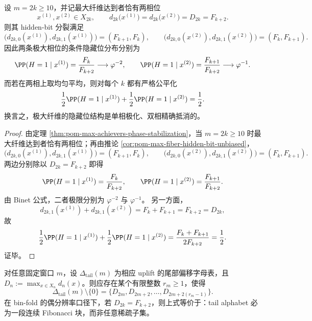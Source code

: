 \begin{theorem}[极大纤维偶支两相的精确公平化]\label{thm:conclusion-window6-even-maxfiber-hiddenbit-exact-fairization}
设 \(m=2k\ge 10\)，并记最大纤维达到者恰有两相位
\[
x^{(1)},x^{(2)}\in X_{2k},
\qquad
d_{2k}\bigl(x^{(1)}\bigr)=d_{2k}\bigl(x^{(2)}\bigr)=D_{2k}=F_{k+2}.
\]
则其 hidden-bit 分裂满足
\[
\bigl(d_{2k,0}(x^{(1)}),d_{2k,1}(x^{(1)})\bigr)=(F_{k+1},F_k),
\qquad
\bigl(d_{2k,0}(x^{(2)}),d_{2k,1}(x^{(2)})\bigr)=(F_k,F_{k+1}).
\]
因此两条极大相位的条件隐藏位分布分别为
\[
\PP(H=1\mid x^{(1)})=\frac{F_k}{F_{k+2}}\longrightarrow \varphi^{-2},
\qquad
\PP(H=1\mid x^{(2)})=\frac{F_{k+1}}{F_{k+2}}\longrightarrow \varphi^{-1}.
\]
而若在两相上取均匀平均，则对每个 \(k\) 都有严格公平化
\[
\frac12\PP(H=1\mid x^{(1)})+\frac12\PP(H=1\mid x^{(2)})=\frac12.
\]
换言之，极大纤维的隐藏位结构是单相极化、双相精确抵消的。
\end{theorem}

\begin{proof}
由定理 \ref{thm:pom-max-achievers-phase-stabilization}，当 \(m=2k\ge 10\) 时最大纤维达到者恰有两相位；再由推论 \ref{cor:pom-max-fiber-hidden-bit-unbiased}，
\[
\bigl(d_{2k,0}(x^{(1)}),d_{2k,1}(x^{(1)})\bigr)=(F_{k+1},F_k),
\qquad
\bigl(d_{2k,0}(x^{(2)}),d_{2k,1}(x^{(2)})\bigr)=(F_k,F_{k+1}).
\]
两边分别除以 \(D_{2k}=F_{k+2}\) 即得
\[
\PP(H=1\mid x^{(1)})=\frac{F_k}{F_{k+2}},
\qquad
\PP(H=1\mid x^{(2)})=\frac{F_{k+1}}{F_{k+2}}.
\]
由 Binet 公式，二者极限分别为 \(\varphi^{-2}\) 与 \(\varphi^{-1}\)。
另一方面，
\[
d_{2k,1}(x^{(1)})+d_{2k,1}(x^{(2)})=F_k+F_{k+1}=F_{k+2}=D_{2k},
\]
故
\[
\frac12\PP(H=1\mid x^{(1)})+\frac12\PP(H=1\mid x^{(2)})
=
\frac{F_k+F_{k+1}}{2F_{k+2}}
=\frac12.
\]
证毕。
\end{proof}





\begin{conjecture}\label{conj:conclusion-tail-alphabet-forward-maximality}
对任意固定窗口 \(m\)，设 \(\Delta_{\mathrm{tail}}(m)\) 为相应 uplift 的尾部偏移字母表，且 \(D_n:=\max_{x\in X_n}d_n(x)\)。则应存在某个有限整数 \(r_m\ge 1\)，使得
\[
\Delta_{\mathrm{tail}}(m)\setminus\{0\}
=
\{D_{2m},D_{2m+2},\dots,D_{2m+2(r_m-1)}\}.
\]
在 bin-fold 的偶分辨率口径下，若 \(D_{2k}=F_{k+2}\)，则上式等价于：tail alphabet 必为一段连续 Fibonacci 块，而非任意稀疏子集。
\end{conjecture}

